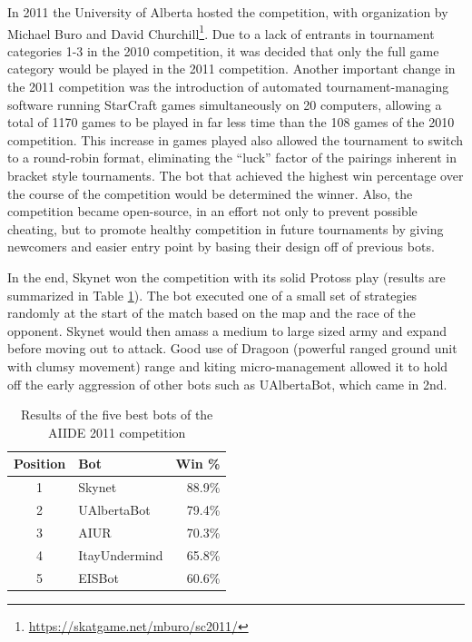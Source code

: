 \documentclass[journal]{IEEEtran}
\begin{document}
In 2011 the University of Alberta hosted the competition, with organization by Michael Buro and
David Churchill\footnote{\url{https://skatgame.net/mburo/sc2011/}}. Due to a lack of entrants in tournament categories 1-3 in the 2010 competition, it was
decided that only the full game category would be played in the 2011 competition. Another important
change in the 2011 competition was the introduction of automated tournament-managing software running
StarCraft games simultaneously on 20 computers, allowing a total of 1170 games to be played in far less
time than the 108 games of the 2010 competition. This increase in games played also allowed the tournament
to switch to a round-robin format, eliminating the ``luck'' factor of the pairings inherent in bracket
style tournaments. The bot that achieved the highest win percentage over the course of the competition would
be determined the winner. Also, the competition became open-source, in an effort not
only to prevent possible cheating, but to promote healthy competition in future tournaments by giving
newcomers and easier entry point by basing their design off of previous bots.

In the  end, Skynet  won the competition  with its solid  Protoss play
(results  are  summarized   in  Table  \ref{tab:aiide2011}).  The  bot
executed one of a small set of strategies randomly at the start of the
match based on the map and the race of the opponent. Skynet would then
amass a  medium to large  sized army and  expand before moving  out to
attack. Good  use of Dragoon (powerful ranged ground unit with clumsy movement) range and  kiting micro-management allowed
it to hold off the early aggression of other bots such as UAlbertaBot,
which came in 2nd.

\begin{table}[!b]
\caption{Results of the five best bots of the AIIDE 2011 competition}
\label{tab:aiide2011}
\centering
\begin{tabular}{|c|l|r|}
\hline
{\bfseries Position} & {\bfseries Bot} & {\bfseries Win \%} \\
\hline
1 & Skynet & 88.9\% \\
2 & UAlbertaBot & 79.4\% \\
3 & AIUR & 70.3\% \\
4 & ItayUndermind & 65.8\% \\
5 & EISBot & 60.6\% \\
\hline
\end{tabular}
\end{table}
\end{document}
